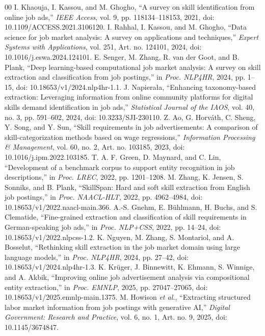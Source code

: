 \documentclass[conference]{IEEEtran}
\begin{document}
\begin{thebibliography}{00}
 I. Khaouja, I. Kassou, and M. Ghogho, ``A survey on skill identification from online job ads,'' \emph{IEEE Access}, vol. 9, pp. 118134--118153, 2021, doi: 10.1109/ACCESS.2021.3106120.
 I. Rahhal, I. Kassou, and M. Ghogho, ``Data science for job market analysis: A survey on applications and techniques,'' \emph{Expert Systems with Applications}, vol. 251, Art. no. 124101, 2024, doi: 10.1016/j.eswa.2024.124101.
 E. Senger, M. Zhang, R. van der Goot, and B. Plank, ``Deep learning-based computational job market analysis: A survey on skill extraction and classification from job postings,'' in \emph{Proc. NLP4HR}, 2024, pp. 1--15, doi: 10.18653/v1/2024.nlp4hr-1.1.
 J. Napiera\l{}a, ``Enhancing taxonomy-based extraction: Leveraging information from online community platforms for digital skills demand identification in job ads,'' \emph{Statistical Journal of the IAOS}, vol. 40, no. 3, pp. 591--602, 2024, doi: 10.3233/SJI-230110.
 Z. Ao, G. Horv\'ath, C. Sheng, Y. Song, and Y. Sun, ``Skill requirements in job advertisements: A comparison of skill-categorization methods based on wage regressions,'' \emph{Information Processing \& Management}, vol. 60, no. 2, Art. no. 103185, 2023, doi: 10.1016/j.ipm.2022.103185.
 T. A. F. Green, D. Maynard, and C. Lin, ``Development of a benchmark corpus to support entity recognition in job descriptions,'' in \emph{Proc. LREC}, 2022, pp. 1201--1208.
 M. Zhang, K. Jensen, S. Sonniks, and B. Plank, ``SkillSpan: Hard and soft skill extraction from English job postings,'' in \emph{Proc. NAACL-HLT}, 2022, pp. 4962--4984, doi: 10.18653/v1/2022.naacl-main.366.
 A.-S. Gnehm, E. B\"uhlmann, H. Buchs, and S. Clematide, ``Fine-grained extraction and classification of skill requirements in German-speaking job ads,'' in \emph{Proc. NLP+CSS}, 2022, pp. 14--24, doi: 10.18653/v1/2022.nlpcss-1.2.
 K. Nguyen, M. Zhang, S. Montariol, and A. Bosselut, ``Rethinking skill extraction in the job market domain using large language models,'' in \emph{Proc. NLP4HR}, 2024, pp. 27--42, doi: 10.18653/v1/2024.nlp4hr-1.3.
 K. Kr\"uger, J. Binnewitt, K. Ehmann, S. Winnige, and A. Akbik, ``Improving online job advertisement analysis via compositional entity extraction,'' in \emph{Proc. EMNLP}, 2025, pp. 27047--27065, doi: 10.18653/v1/2025.emnlp-main.1375.
 M. Howison \emph{et al.}, ``Extracting structured labor market information from job postings with generative AI,'' \emph{Digital Government: Research and Practice}, vol. 6, no. 1, Art. no. 9, 2025, doi: 10.1145/3674847.

\end{thebibliography}
\end{document}
